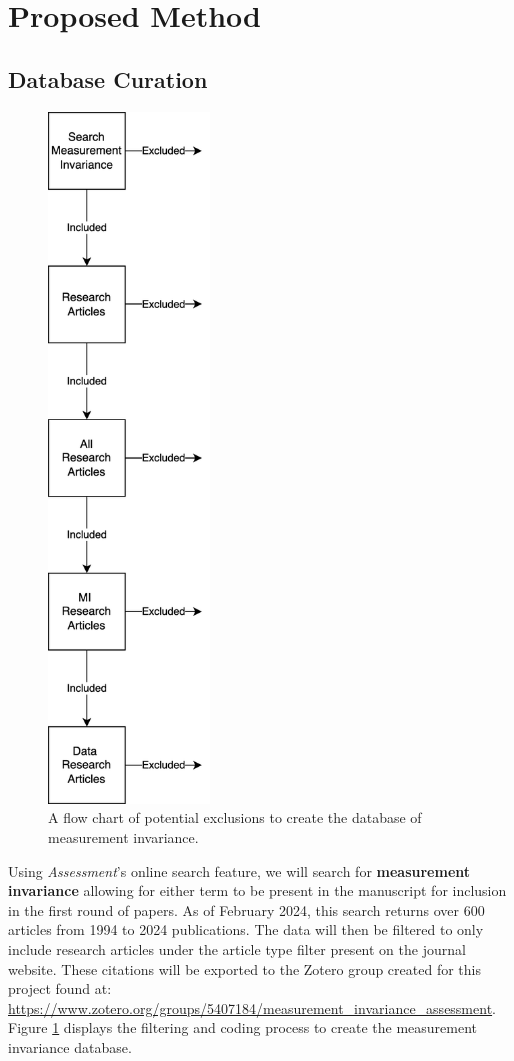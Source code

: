 \documentclass[
  man]{apa7}
\begin{document}
\hypertarget{proposed-method}{%
\section{Proposed Method}\label{proposed-method}}

\hypertarget{database-curation}{%
\subsection{Database Curation}\label{database-curation}}

\begin{figure}
\includegraphics[width=1.69in]{../pics/data_curation} \caption{A flow chart of potential exclusions to create the database of measurement invariance.}\label{fig:figure-process}
\end{figure}

Using \emph{Assessment}'s online search feature, we will search for \textbf{measurement invariance} allowing for either term to be present in the manuscript for inclusion in the first round of papers. As of February 2024, this search returns over 600 articles from 1994 to 2024 publications. The data will then be filtered to only include research articles under the article type filter present on the journal website. These citations will be exported to the Zotero group created for this project found at: \url{https://www.zotero.org/groups/5407184/measurement_invariance_assessment}. Figure \ref{fig:figure-process} displays the filtering and coding process to create the measurement invariance database.
\end{document}
